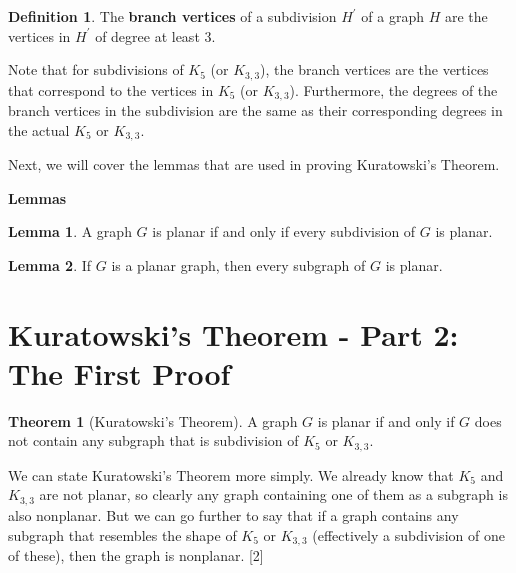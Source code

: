 \documentclass[12pt]{article}
\theoremstyle{definition}
\newtheorem{thrm}{Theorem}[section]
\newtheorem{defn}{Definition}[section]
\newtheorem{lem}{Lemma}[section]
\begin{document}
    \begin{bluebox}
        \begin{defn}
            The \textbf{branch vertices} of a subdivision $H^{\prime}$ of a graph $H$ are the vertices in $H^{\prime}$ of degree at least 3.
        \end{defn}
    \end{bluebox}
    \noindent Note that for subdivisions of $K_5$ (or $K_{3,3}$), the branch vertices are the vertices that correspond to the vertices in $K_5$ (or $K_{3,3}$). Furthermore, the degrees of the branch vertices in the subdivision are the same as their corresponding degrees in the actual $K_5$ or $K_{3,3}$.

    \noindent Next, we will cover the lemmas that are used in proving Kuratowski's Theorem.

    \textbf{Lemmas}
    \begin{greenbox}
        \begin{lem}
            A graph $G$ is planar if and only if every subdivision of $G$ is planar.
        \end{lem}
    \end{greenbox}

    \begin{greenbox}
        \begin{lem}
            If $G$ is a planar graph, then every subgraph of $G$ is planar.
        \end{lem}
    \end{greenbox}

\section{Kuratowski's Theorem - Part 2: The First Proof}
\begin{greenbox}
    \begin{thrm}[Kuratowski's Theorem]
        A graph $G$ is planar if and only if $G$ does not contain any subgraph that is subdivision of $K_5$ or $K_{3,3}$.
    \end{thrm}
\end{greenbox}

We can state Kuratowski's Theorem more simply. We already know that $K_5$ and $K_{3,3}$ are not planar, so clearly any graph containing one of them as a subgraph is also nonplanar. But we can go further to say that if a graph contains any subgraph that resembles the shape of $K_5$ or $K_{3,3}$ (effectively a subdivision of one of these), then the graph is nonplanar. [2]
\end{document}
